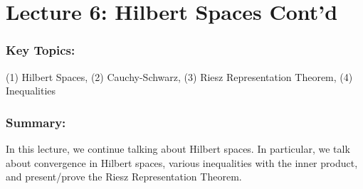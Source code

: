 \documentclass{article}
\begin{document}
\section{Lecture 6: Hilbert Spaces Cont'd}
\subsubsection{Key Topics:}
(1) Hilbert Spaces, (2) Cauchy-Schwarz, (3) Riesz Representation Theorem, (4) Inequalities
\subsubsection{Summary:}
In this lecture, we continue talking about Hilbert spaces. In particular, we talk about convergence in Hilbert spaces, various inequalities with the inner product, and present/prove the Riesz Representation Theorem. 
\end{document}
